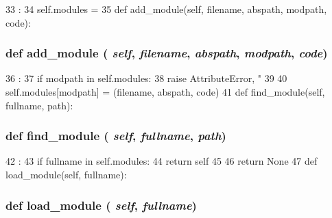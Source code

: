 \begin{DoxyCode}
33                       :
34         self.modules = {}
35 
    def add_module(self, filename, abspath, modpath, code):
\end{DoxyCode}
\hypertarget{classimporter_1_1CodeImporter_ad22d65f9dea83524b07e886e4201cec3}{
\subsubsection[{add\_\-module}]{\setlength{\rightskip}{0pt plus 5cm}def add\_\-module ( {\em self}, \/   {\em filename}, \/   {\em abspath}, \/   {\em modpath}, \/   {\em code})}}
\label{classimporter_1_1CodeImporter_ad22d65f9dea83524b07e886e4201cec3}



\begin{DoxyCode}
36                                                           :
37         if modpath in self.modules:
38             raise AttributeError, "%
39 
40         self.modules[modpath] = (filename, abspath, code)
41 
    def find_module(self, fullname, path):
\end{DoxyCode}
\hypertarget{classimporter_1_1CodeImporter_aa4d132840fb72dbe7fb6a9196a6649bf}{
\subsubsection[{find\_\-module}]{\setlength{\rightskip}{0pt plus 5cm}def find\_\-module ( {\em self}, \/   {\em fullname}, \/   {\em path})}}
\label{classimporter_1_1CodeImporter_aa4d132840fb72dbe7fb6a9196a6649bf}



\begin{DoxyCode}
42                                          :
43         if fullname in self.modules:
44             return self
45 
46         return None
47 
    def load_module(self, fullname):
\end{DoxyCode}
\hypertarget{classimporter_1_1CodeImporter_a89668954a89cab781fc0af952e937dc4}{
\subsubsection[{load\_\-module}]{\setlength{\rightskip}{0pt plus 5cm}def load\_\-module ( {\em self}, \/   {\em fullname})}}
\label{classimporter_1_1CodeImporter_a89668954a89cab781fc0af952e937dc4}



